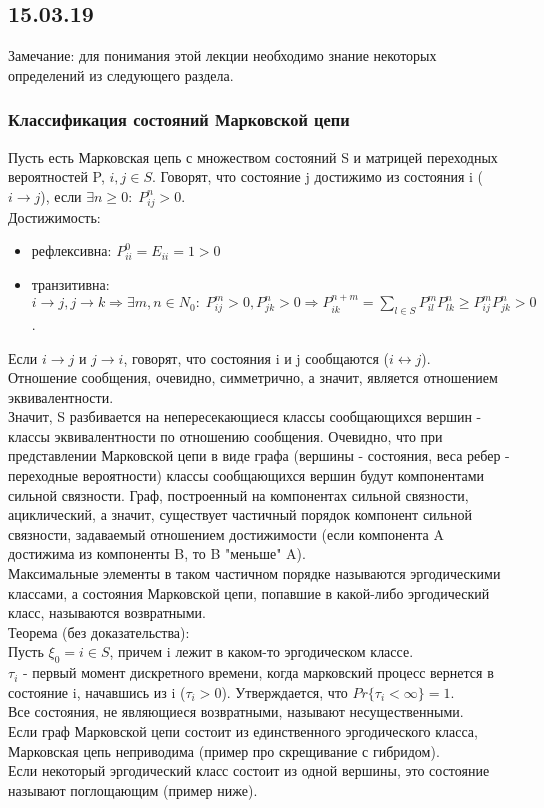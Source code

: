 \subsection{15.03.19}
Замечание: для понимания этой лекции необходимо знание некоторых определений из следующего раздела.
\subsubsection{Классификация состояний Марковской цепи}
Пусть есть Марковская цепь с множеством состояний S и матрицей переходных вероятностей P, $i, j \in S$.
Говорят, что состояние j достижимо из состояния i ($i \rightarrow j$), если $\exists n \geq 0: \; P^n_{ij} > 0$.\\
Достижимость: \\
\begin{itemize}
\item рефлексивна: $P^0_{ii} = E_{ii} = 1 > 0$\\
\item транзитивна: $i \rightarrow j, j \rightarrow k \Rightarrow \exists m, n \in N_0: \; P^m_{ij} > 0, P^n_{jk} > 0 \Rightarrow P^{n + m}_{ik} = \sum\limits_{l \in S} P^m_{il}P^n_{lk} \geq P^m_{ij}P^n_{jk} > 0$.\\
\end{itemize}
Если $i \rightarrow j$ и $j \rightarrow i$, говорят, что состояния i и j сообщаются ($i \leftrightarrow j$).\\
Отношение сообщения, очевидно, симметрично, а значит, является отношением эквивалентности.\\
Значит, S разбивается на непересекающиеся классы сообщающихся вершин - классы эквивалентности по отношению сообщения.
Очевидно, что при представлении Марковской цепи в виде графа (вершины - состояния, веса ребер - переходные вероятности) классы сообщающихся вершин будут компонентами сильной связности.
Граф, построенный на компонентах сильной связности, ациклический, а значит, существует частичный порядок компонент сильной связности, задаваемый отношением достижимости (если компонента A достижима из компоненты B, то B "меньше" A).\\
Максимальные элементы в таком частичном порядке называются эргодическими классами, а состояния Марковской цепи, попавшие в какой-либо эргодический класс, называются возвратными.\\
Теорема (без доказательства):\\
Пусть $\xi_0 = i \in S$, причем i лежит в каком-то эргодическом классе.\\
$\tau_i$ - первый момент дискретного времени, когда марковский процесс вернется в состояние i, начавшись из i ($\tau_i > 0$). Утверждается, что $Pr\{\tau_i < \infty\} = 1$.\\
Все состояния, не являющиеся возвратными, называют несущественными.\\
Если граф Марковской цепи состоит из единственного эргодического класса, Марковская цепь неприводима (пример про скрещивание с гибридом).\\
Если некоторый эргодический класс состоит из одной вершины, это состояние называют поглощающим (пример ниже).
